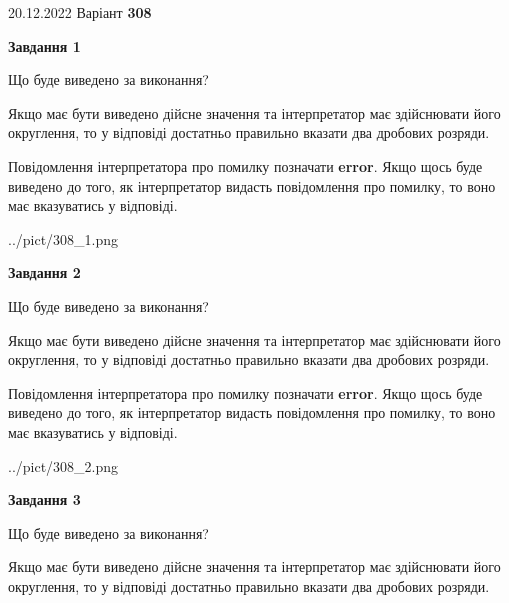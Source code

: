 \documentclass[12pt, ukrainian]{article}
\begin{document}
{20.12.2022 Варіант \No \textbf { 308 }\par}
{
\begin {Large}

{\begin {center}\textbf{Завдання 1}\end {center}}\par
Що буде виведено за виконання? \par

Якщо має бути виведено дійсне значення та інтерпретатор має здійснювати його округлення, 
то у відповіді достатньо правильно вказати два дробових розряди.

Повідомлення інтерпретатора про помилку позначати \textbf{error}.
Якщо щось буде виведено до того, як інтерпретатор видасть повідомлення про помилку, 
то воно має вказуватись у відповіді. \par

\begin{center}
	{../pict/308_1.png}
\end{center}
\newpage

{\begin {center}\textbf{Завдання 2}\end {center}}\par
Що буде виведено за виконання? \par

Якщо має бути виведено дійсне значення та інтерпретатор має здійснювати його округлення, 
то у відповіді достатньо правильно вказати два дробових розряди.

Повідомлення інтерпретатора про помилку позначати \textbf{error}.
Якщо щось буде виведено до того, як інтерпретатор видасть повідомлення про помилку, 
то воно має вказуватись у відповіді. \par

\begin{center}
	{../pict/308_2.png}
\end{center}
\newpage

{\begin {center}\textbf{Завдання 3}\end {center}}\par
Що буде виведено за виконання? \par

Якщо має бути виведено дійсне значення та інтерпретатор має здійснювати його округлення, 
то у відповіді достатньо правильно вказати два дробових розряди.


\end{Large}}
\end{document}
